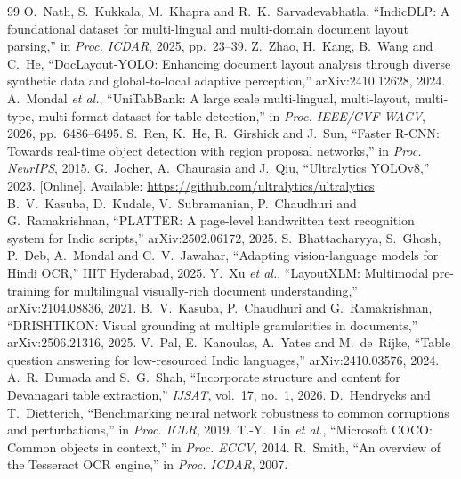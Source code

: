 \documentclass[conference]{IEEEtran}
\begin{document}
\begin{thebibliography}{99}
 O.~Nath, S.~Kukkala, M.~Khapra and R.~K.~Sarvadevabhatla, ``IndicDLP: A foundational dataset for multi-lingual and multi-domain document layout parsing,'' in \emph{Proc. ICDAR}, 2025, pp.~23--39.
 Z.~Zhao, H.~Kang, B.~Wang and C.~He, ``DocLayout-YOLO: Enhancing document layout analysis through diverse synthetic data and global-to-local adaptive perception,'' arXiv:2410.12628, 2024.
 A.~Mondal \emph{et al.}, ``UniTabBank: A large scale multi-lingual, multi-layout, multi-type, multi-format dataset for table detection,'' in \emph{Proc. IEEE/CVF WACV}, 2026, pp.~6486--6495.
 S.~Ren, K.~He, R.~Girshick and J.~Sun, ``Faster R-CNN: Towards real-time object detection with region proposal networks,'' in \emph{Proc. NeurIPS}, 2015.
 G.~Jocher, A.~Chaurasia and J.~Qiu, ``Ultralytics YOLOv8,'' 2023. [Online]. Available: \url{https://github.com/ultralytics/ultralytics}
 B.~V.~Kasuba, D.~Kudale, V.~Subramanian, P.~Chaudhuri and G.~Ramakrishnan, ``PLATTER: A page-level handwritten text recognition system for Indic scripts,'' arXiv:2502.06172, 2025.
 S.~Bhattacharyya, S.~Ghosh, P.~Deb, A.~Mondal and C.~V.~Jawahar, ``Adapting vision-language models for Hindi OCR,'' IIIT Hyderabad, 2025.
 Y.~Xu \emph{et al.}, ``LayoutXLM: Multimodal pre-training for multilingual visually-rich document understanding,'' arXiv:2104.08836, 2021.
 B.~V.~Kasuba, P.~Chaudhuri and G.~Ramakrishnan, ``DRISHTIKON: Visual grounding at multiple granularities in documents,'' arXiv:2506.21316, 2025.
 V.~Pal, E.~Kanoulas, A.~Yates and M.~de~Rijke, ``Table question answering for low-resourced Indic languages,'' arXiv:2410.03576, 2024.
 A.~R.~Dumada and S.~G.~Shah, ``Incorporate structure and content for Devanagari table extraction,'' \emph{IJSAT}, vol.~17, no.~1, 2026.
 D.~Hendrycks and T.~Dietterich, ``Benchmarking neural network robustness to common corruptions and perturbations,'' in \emph{Proc. ICLR}, 2019.
 T.-Y.~Lin \emph{et al.}, ``Microsoft COCO: Common objects in context,'' in \emph{Proc. ECCV}, 2014.
 R.~Smith, ``An overview of the Tesseract OCR engine,'' in \emph{Proc. ICDAR}, 2007.
\end{thebibliography}
\end{document}
